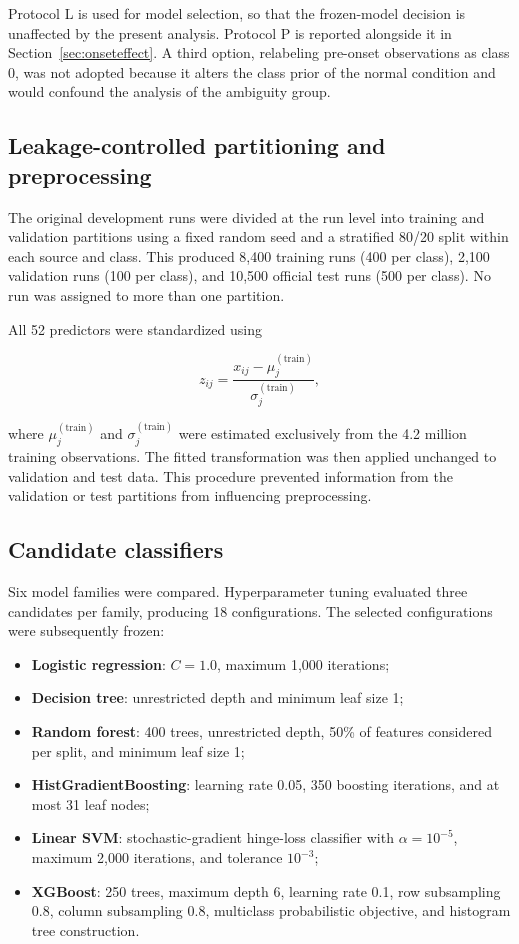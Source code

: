 \documentclass[12pt,a4paper]{article}
\begin{document}
Protocol L is used for model selection, so that the frozen-model decision is
unaffected by the present analysis. Protocol P is reported alongside it in
Section~\ref{sec:onseteffect}. A third option, relabeling pre-onset
observations as class 0, was not adopted because it alters the class prior of
the normal condition and would confound the analysis of the ambiguity group.

\subsection{Leakage-controlled partitioning and preprocessing}
\label{sec:split}

The original development runs were divided at the run level into training and
validation partitions using a fixed random seed and a stratified 80/20 split
within each source and class. This produced 8,400 training runs (400 per class),
2,100 validation runs (100 per class), and 10,500 official test runs (500 per
class). No run was assigned to more than one partition.

All 52 predictors were standardized using

\begin{equation}
z_{ij}=\frac{x_{ij}-\mu_j^{(\mathrm{train})}}
{\sigma_j^{(\mathrm{train})}},
\end{equation}

where $\mu_j^{(\mathrm{train})}$ and $\sigma_j^{(\mathrm{train})}$ were
estimated exclusively from the 4.2 million training observations. The fitted
transformation was then applied unchanged to validation and test data. This
procedure prevented information from the validation or test partitions from
influencing preprocessing.

\subsection{Candidate classifiers}

Six model families were compared. Hyperparameter tuning evaluated three
candidates per family, producing 18 configurations. The selected configurations
were subsequently frozen:

\begin{itemize}
  \item \textbf{Logistic regression}: $C=1.0$, maximum 1,000 iterations;
  \item \textbf{Decision tree}: unrestricted depth and minimum leaf size 1;
  \item \textbf{Random forest}: 400 trees, unrestricted depth, 50\% of features
  considered per split, and minimum leaf size 1;
  \item \textbf{HistGradientBoosting}: learning rate 0.05, 350 boosting
  iterations, and at most 31 leaf nodes;
  \item \textbf{Linear SVM}: stochastic-gradient hinge-loss classifier with
  $\alpha=10^{-5}$, maximum 2,000 iterations, and tolerance $10^{-3}$;
  \item \textbf{XGBoost}: 250 trees, maximum depth 6, learning rate 0.1,
  row subsampling 0.8, column subsampling 0.8, multiclass probabilistic
  objective, and histogram tree construction.
\end{itemize}
\end{document}
